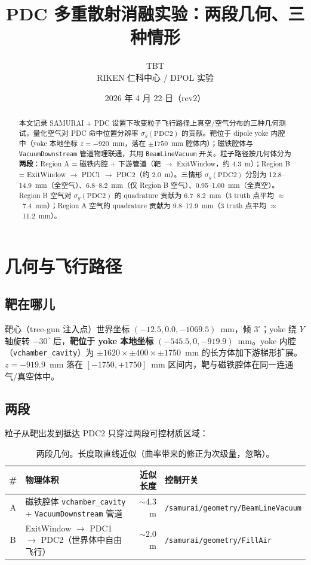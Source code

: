 \documentclass[a4paper, 11pt]{article}
\title{\textbf{PDC 多重散射消融实验：两段几何、三种情形}}
\author{TBT \\ RIKEN 仁科中心 / DPOL 实验}
\date{2026 年 4 月 22 日（rev2）}
\begin{document}
\maketitle

\begin{abstract}
\noindent
本文记录 SAMURAI + PDC 设置下改变粒子飞行路径上真空/空气分布的三种几何测试，量化空气对 PDC 命中位置分辨率 $\sigma_y(\mathrm{PDC2})$ 的贡献。靶位于 dipole yoke 内腔中（yoke 本地坐标 $z = -920$~mm，落在 $\pm 1750$~mm 腔体内）；磁铁腔体与 \texttt{VacuumDownstream} 管道物理联通，共用 \texttt{BeamLineVacuum} 开关。粒子路径按几何体分为 \textbf{两段}：Region A = 磁铁内腔 + 下游管道（靶 $\to$ ExitWindow，约 4.3~m）；Region B = ExitWindow $\to$ PDC1 $\to$ PDC2（约 2.0~m）。三情形 $\sigma_y(\mathrm{PDC2})$ 分别为 12.8--14.9~mm（全空气）、6.8--8.2~mm（仅 Region B 空气）、0.95--1.00~mm（全真空）。Region B 空气对 $\sigma_y(\mathrm{PDC2})$ 的 quadrature 贡献为 6.7--8.2~mm（3 truth 点平均 $\approx$~7.4~mm）；Region A 空气的 quadrature 贡献为 9.8--12.9~mm（3 truth 点平均 $\approx$~11.2~mm）。
\end{abstract}

\tableofcontents

\section{几何与飞行路径}

\subsection{靶在哪儿}

靶心（tree-gun 注入点）世界坐标 $(-12.5, 0.0, -1069.5)$~mm，倾 $3^\circ$；yoke 绕 $Y$ 轴旋转 $-30^\circ$ 后，\textbf{靶位于 yoke 本地坐标} $(-545.5, 0, -919.9)$~mm。yoke 内腔（\texttt{vchamber\_cavity}）为 $\pm 1620 \times \pm 400 \times \pm 1750$~mm 的长方体加下游梯形扩展。$z=-919.9$~mm 落在 $[-1750, +1750]$~mm 区间内，靶与磁铁腔体在同一连通气/真空体中。

\subsection{两段}

粒子从靶出发到抵达 PDC2 只穿过两段可控材质区域：

\begin{table}[H]
\centering
\caption{两段几何。长度取直线近似（曲率带来的修正为次级量，忽略）。}
\label{tab:path}
\begin{tabular}{clrl}
\toprule
\# & 物理体积 & 近似长度 & 控制开关 \\
\midrule
A & 磁铁腔体 \texttt{vchamber\_cavity} + \texttt{VacuumDownstream} 管道 & $\sim 4.3$~m & \texttt{/samurai/geometry/BeamLineVacuum} \\
B & ExitWindow $\to$ PDC1 $\to$ PDC2（世界体中自由飞行） & $\sim 2.0$~m & \texttt{/samurai/geometry/FillAir}  \\
\bottomrule
\end{tabular}
\end{table}
\end{document}
